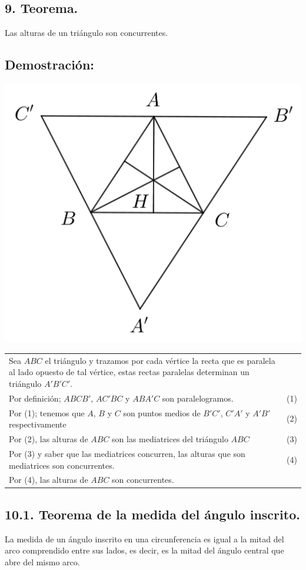 \documentclass[12pt,a4paper]{article}
\begin{document}
\subsection*{9. Teorema.}
Las alturas de un triángulo son concurrentes.
\subsection*{Demostración:}
\begin{center}
\includegraphics[scale=0.6]{alturas.png} 
\end{center}
\begin{tabular}{p{15.9cm}p{1cm}}
Sea $ABC$ el triángulo y trazamos por cada vértice la recta que es paralela al lado opuesto de tal vértice, estas rectas paralelas determinan un triángulo $A'B'C'$.
\\Por definición; $ABCB'$, $AC'BC$ y $ABA'C$ son paralelogramos. &(1) 
\\Por (1); tenemos que $A$, $B$ y $C$ son puntos medios de $B'C'$,  $C'A'$ y $A'B'$ respectivamente& (2)
\\Por (2), las alturas de $ABC$ son las mediatrices del triángulo $ABC$ &(3)
\\Por (3) y saber que las mediatrices concurren, las alturas que son mediatrices son concurrentes. &\medskip(4)
\\Por (4), las alturas de $ABC$ son concurrentes.
\end{tabular}
\subsection*{10.1. Teorema de la medida del ángulo inscrito.}
La medida de un ángulo inscrito en una circunferencia es igual a la mitad del arco comprendido entre sus lados, es decir, es la mitad del ángulo central que abre del mismo arco.
\end{document}
